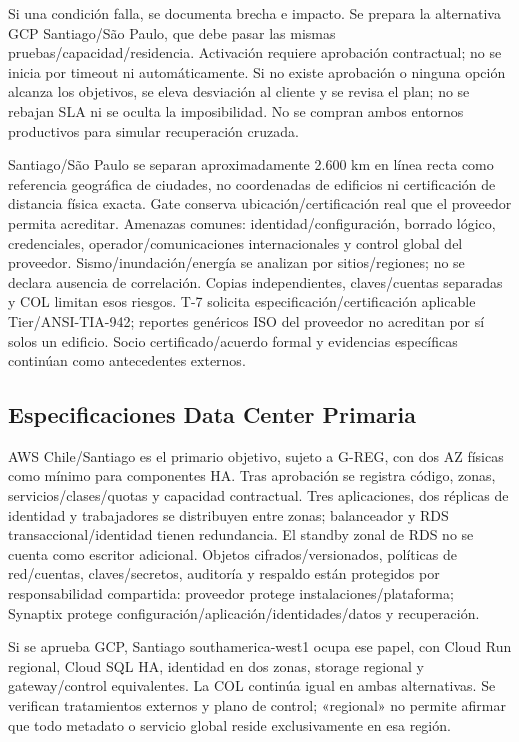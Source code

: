 \documentclass[11pt,letterpaper]{report}
\begin{document}
Si una condición falla, se documenta brecha e impacto. Se prepara la alternativa GCP Santiago/São Paulo, que debe pasar las mismas pruebas/capacidad/residencia. Activación requiere aprobación contractual; no se inicia por timeout ni automáticamente. Si no existe aprobación o ninguna opción alcanza los objetivos, se eleva desviación al cliente y se revisa el plan; no se rebajan SLA ni se oculta la imposibilidad. No se compran ambos entornos productivos para simular recuperación cruzada.

Santiago/São Paulo se separan aproximadamente 2.600 km en línea recta como referencia geográfica de ciudades, no coordenadas de edificios ni certificación de distancia física exacta. Gate conserva ubicación/certificación real que el proveedor permita acreditar. Amenazas comunes: identidad/configuración, borrado lógico, credenciales, operador/comunicaciones internacionales y control global del proveedor. Sismo/inundación/energía se analizan por sitios/regiones; no se declara ausencia de correlación. Copias independientes, claves/cuentas separadas y COL limitan esos riesgos. T-7 solicita especificación/certificación aplicable Tier/ANSI-TIA-942; reportes genéricos ISO del proveedor no acreditan por sí solos un edificio. Socio certificado/acuerdo formal y evidencias específicas continúan como antecedentes externos.

\subsection{Especificaciones Data Center Primaria}
AWS Chile/Santiago es el primario objetivo, sujeto a G-REG, con dos AZ físicas como mínimo para componentes HA. Tras aprobación se registra código, zonas, servicios/clases/quotas y capacidad contractual. Tres aplicaciones, dos réplicas de identidad y trabajadores se distribuyen entre zonas; balanceador y RDS transaccional/identidad tienen redundancia. El standby zonal de RDS no se cuenta como escritor adicional. Objetos cifrados/versionados, políticas de red/cuentas, claves/secretos, auditoría y respaldo están protegidos por responsabilidad compartida: proveedor protege instalaciones/plataforma; Synaptix protege configuración/aplicación/identidades/datos y recuperación.

Si se aprueba GCP, Santiago southamerica-west1 ocupa ese papel, con Cloud Run regional, Cloud SQL HA, identidad en dos zonas, storage regional y gateway/control equivalentes. La COL continúa igual en ambas alternativas. Se verifican tratamientos externos y plano de control; «regional» no permite afirmar que todo metadato o servicio global reside exclusivamente en esa región.
\end{document}
